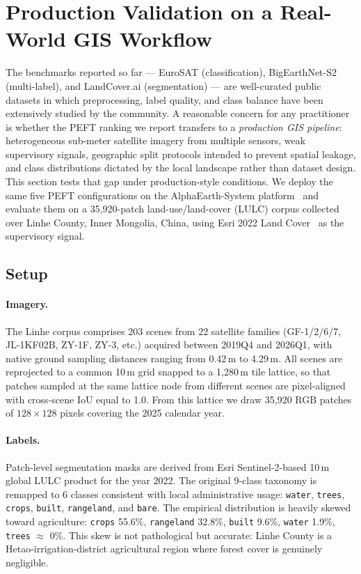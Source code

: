 \section{Production Validation on a Real-World GIS Workflow}
\label{sec:linhe}

The benchmarks reported so far --- EuroSAT (classification), BigEarthNet-S2 (multi-label), and LandCover.ai (segmentation) --- are well-curated public datasets in which preprocessing, label quality, and class balance have been extensively studied by the community. A reasonable concern for any practitioner is whether the PEFT ranking we report transfers to a \emph{production GIS pipeline}: heterogeneous sub-meter satellite imagery from multiple sensors, weak supervisory signals, geographic split protocols intended to prevent spatial leakage, and class distributions dictated by the local landscape rather than dataset design. This section tests that gap under production-style conditions. We deploy the same five PEFT configurations on the AlphaEarth-System platform~\cite{alphaearth2026} and evaluate them on a 35{,}920-patch land-use/land-cover (LULC) corpus collected over Linhe County, Inner Mongolia, China, using Esri 2022 Land Cover~\cite{karra2022esri} as the supervisory signal.

\subsection{Setup}

\paragraph{Imagery.} The Linhe corpus comprises 203 scenes from 22 satellite families (GF-1/2/6/7, JL-1KF02B, ZY-1F, ZY-3, etc.) acquired between 2019Q4 and 2026Q1, with native ground sampling distances ranging from 0.42\,m to 4.29\,m. All scenes are reprojected to a common 10\,m grid snapped to a 1{,}280\,m tile lattice, so that patches sampled at the same lattice node from different scenes are pixel-aligned with cross-scene IoU equal to 1.0. From this lattice we draw 35{,}920 RGB patches of $128 \times 128$ pixels covering the 2025 calendar year.

\paragraph{Labels.} Patch-level segmentation masks are derived from Esri Sentinel-2-based 10\,m global LULC product for the year 2022. The original 9-class taxonomy is remapped to 6 classes consistent with local administrative usage: \texttt{water}, \texttt{trees}, \texttt{crops}, \texttt{built}, \texttt{rangeland}, and \texttt{bare}. The empirical distribution is heavily skewed toward agriculture: \texttt{crops} 55.6\%, \texttt{rangeland} 32.8\%, \texttt{built} 9.6\%, \texttt{water} 1.9\%, \texttt{trees} $\approx$ 0\%. This skew is not pathological but accurate: Linhe County is a Hetao-irrigation-district agricultural region where forest cover is genuinely negligible.

